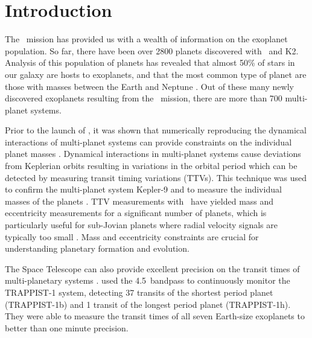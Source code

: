 \section{Introduction}


The \Kepler~mission \citep{Borucki2010} has provided us with a wealth of information on the exoplanet population. So far, there have been over 2800 planets discovered with \Kepler~and K2. Analysis of this population of planets has revealed that almost 50\% of stars in our galaxy are hosts to exoplanets, and that the most common type of planet are those with masses between the Earth and Neptune \citep{Batalha2013, Batalha2014, Fressin2013, Petigura2013a, Petigura2013b}. Out of these many newly discovered exoplanets resulting from the \Kepler~mission, there are more than 700 multi-planet systems.

Prior to the launch of \Kepler, it was shown that numerically reproducing the dynamical interactions of multi-planet systems can provide constraints on the individual planet masses \citep{Holman2005, Agol2005}. Dynamical interactions in multi-planet systems cause deviations from Keplerian orbits resulting in variations in the orbital period which can be detected by measuring transit timing variations (TTVs). This technique was used to confirm the multi-planet system Kepler-9 and to measure the individual masses of the planets \citep{Holman2010}. TTV measurements with \Kepler~have yielded mass and eccentricity measurements for a significant number of planets, which is particularly useful for sub-Jovian planets where radial velocity signals are typically too small \citep{Jontof-Hutter2016,Hadden2017}. Mass and eccentricity constraints are crucial for understanding planetary formation and evolution.

The \spitzer Space Telescope can also provide excellent precision on the transit times of multi-planetary systems \citep[e.g.,][]{Beichman2016, Gillon2017, Berardo2019}. \citet{Gillon2017} used the 4.5\um~bandpass to continuously monitor the TRAPPIST-1 system, detecting 37 transits of the shortest period planet (TRAPPIST-1b) and 1 transit of the longest period planet (TRAPPIST-1h). They were able to measure the transit times of all seven Earth-size exoplanets to better than one minute precision.


